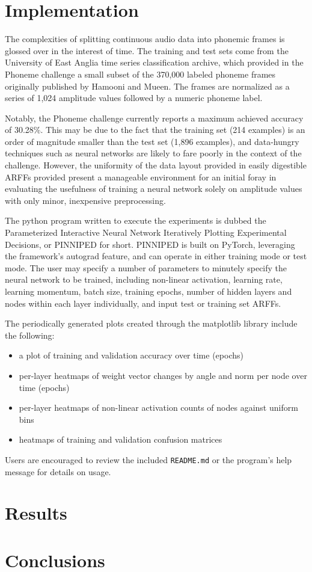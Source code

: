 \documentclass[10pt,epsf]{article}
\begin{document}
\section{Implementation}{
  The complexities of splitting continuous audio data into phonemic frames is glossed
  over in the interest of time. The training and test sets come from the University
  of East Anglia time series classification archive\autocite{ueamvtsca}\autocite{Phoneme},
  which provided in the Phoneme challenge a small subset of the 370,000 labeled phoneme frames originally
  published by Hamooni and Mueen\autocite{DDHCPTS}. The frames are normalized as a series
  of 1,024 amplitude values followed by a numeric phoneme label.

  Notably, the Phoneme challenge currently reports a maximum achieved accuracy of 30.28\%.
  This may be due to the fact that the training set (214 examples) is an order of magnitude smaller than
  the test set (1,896 examples), and data-hungry techniques such as neural networks are likely to fare
  poorly in the context of the challenge. However, the uniformity of the data layout provided in easily
  digestible ARFFs\autocite{scipyloadarff} provided present a manageable environment for an initial foray in
  evaluating the usefulness of training a neural network solely on amplitude values with only
  minor, inexpensive preprocessing.

  The python program written to execute the experiments is dubbed the
  Parameterized Interactive Neural Network Iteratively Plotting Experimental Decisions, or PINNIPED for short.
  PINNIPED is built on PyTorch\autocite{torchnnref}\autocite{torchnntut},
  leveraging the framework's autograd feature, and can operate in either training mode or test mode.
  The user may specify a number of parameters to minutely specify the neural network to be trained,
  including non-linear activation, learning rate, learning momentum, batch size, training epochs,
  number of hidden layers and nodes within each layer individually, and input test or training set ARFFs.

  The periodically generated plots created through the matplotlib\autocite{mplpplot} library include
  the following:
  \begin{itemize}
  \item{a plot of training and validation accuracy over time (epochs)}
  \item{per-layer heatmaps of weight vector changes by angle and norm per node over time (epochs)}
  \item{per-layer heatmaps of non-linear activation counts of nodes against uniform bins}
  \item{heatmaps of training and validation confusion matrices}
  \end{itemize}

  Users are encouraged to review the included \texttt{README.md} or the program's help message
  for details on usage.
}
\section{Results}{
}
\section{Conclusions}{
}

\printbibliography
\end{document}
